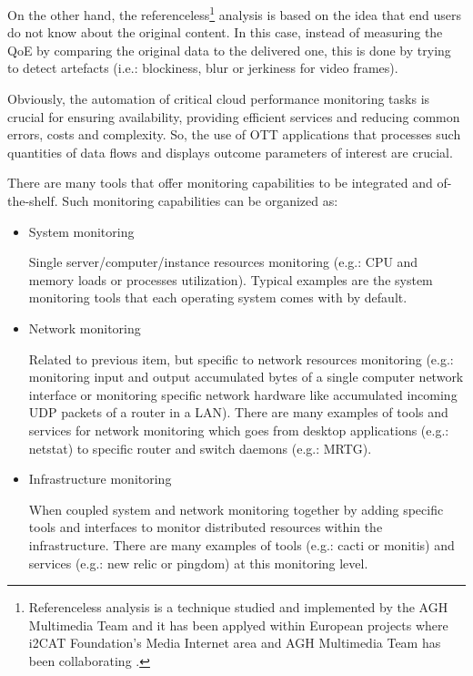 On the other hand, the referenceless\footnote{Referenceless analysis is a technique studied and implemented by the AGH Multimedia Team \cite{AGHTEAM} and it has been applyed within European projects \cite{mitsu} where i2CAT Foundation's Media Internet area and AGH Multimedia Team has been collaborating \cite{AGHQOE}.} analysis is based on the idea that end users do not know about the original content. In this case, instead of measuring the QoE by comparing the original data to the delivered one, this is done by trying to detect artefacts (i.e.: blockiness, blur or jerkiness for video frames).

Obviously, the automation of critical cloud performance monitoring tasks is crucial for ensuring availability, providing efficient services and reducing common errors, costs and complexity. So, the use of OTT applications that processes such quantities of data flows and displays outcome parameters of interest are crucial. 

There are many tools that offer monitoring capabilities to be integrated and of-the-shelf. Such monitoring capabilities can be organized as:

\begin{itemize}
\item System monitoring \hfill

Single server/computer/instance resources monitoring (e.g.: CPU and memory loads or processes utilization). Typical examples are the system monitoring tools that each operating system comes with by default.
\item Network monitoring \hfill

Related to previous item, but specific to network resources monitoring (e.g.: monitoring input and output accumulated bytes of a single computer network interface or monitoring specific network hardware like accumulated incoming UDP packets of a router in a LAN). There are many examples of tools and services for network monitoring which goes from desktop applications (e.g.: netstat) to specific router and switch daemons (e.g.: MRTG).
\item Infrastructure monitoring \hfill

When coupled system and network monitoring together by adding specific tools and interfaces to monitor distributed resources within the infrastructure. There are many examples of tools  (e.g.: cacti or monitis) and services (e.g.: new relic or pingdom) at this monitoring level.
\end{itemize}

